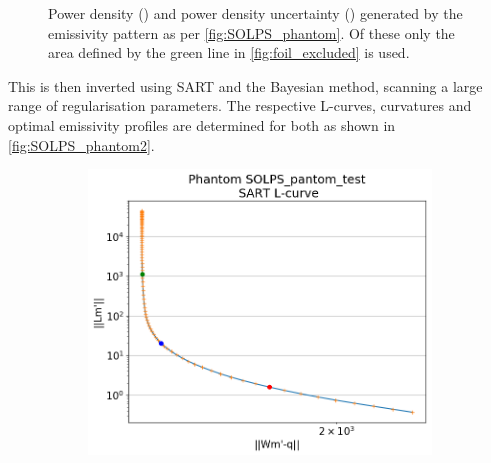 \begin{figure}
\begin{subfigure}{0.45\linewidth}
         \caption{}
         \label{fig:SOLPS_phantom1b}
     \end{subfigure}
    \caption{Power density () and power density uncertainty () generated by the emissivity pattern as per \autoref{fig:SOLPS_phantom}. Of these only the area defined by the green line in \autoref{fig:foil_excluded} is used.}
    \label{fig:SOLPS_phantom1}
\end{figure}

This is then inverted using SART and the Bayesian method, scanning a large range of regularisation parameters. The respective L-curves, curvatures and optimal emissivity profiles are determined for both as shown in \autoref{fig:SOLPS_phantom2}.

\begin{figure}
     \begin{subfigure}{0.45\linewidth}
         \centering
         \includegraphics[trim={0 0 0 45},clip,width=\textwidth]{Chapters/chapter2/figs/inversion_comparison_L_curve_SOLPS_pantom_test-SART.png}
         \caption{}
         \label{fig:SOLPS_phantom2a}
     \end{subfigure}
     \hfill
     \begin{subfigure}{0.45\linewidth}
         \centering

\end{subfigure}
\end{figure}
